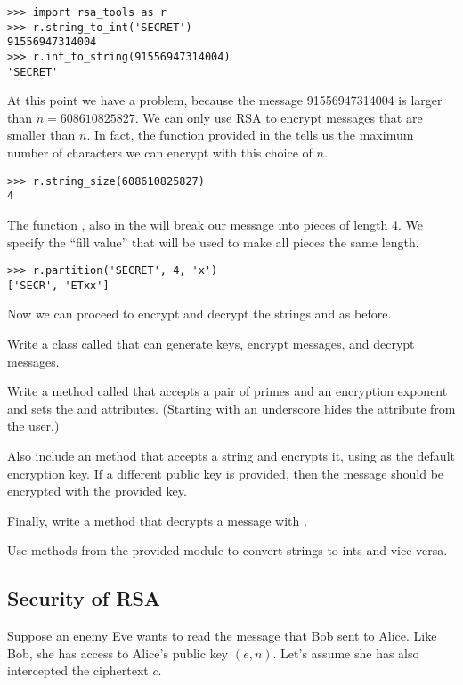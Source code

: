 \begin{lstlisting}
>>> import rsa_tools as r
>>> r.string_to_int('SECRET')
91556947314004
>>> r.int_to_string(91556947314004)
'SECRET'
\end{lstlisting}

At this point we have a problem, because the message 91556947314004 is larger than $n=608610825827$.
We can only use RSA to encrypt messages that are smaller than $n$.
In fact, the function  provided in the  tells us the maximum number of characters we can encrypt with this choice of $n$.

\begin{lstlisting}
>>> r.string_size(608610825827)
4
\end{lstlisting}

The function , also in the  will break our message into pieces of length 4.
We specify the ``fill value''  that will be used to make all pieces the same length.

\begin{lstlisting}
>>> r.partition('SECRET', 4, 'x')
['SECR', 'ETxx']
\end{lstlisting}
Now we can proceed to encrypt and decrypt the strings  and  as before.

\begin{problem}
Write a class called  that can generate keys, encrypt messages, and decrypt messages.

Write a method called  that accepts a pair of primes and an encryption exponent and sets the  and  attributes.
(Starting  with an underscore hides the attribute from the user.)

Also include an  method that accepts a string and encrypts it, using  as the default encryption key.
If a different public key is provided, then the message should be encrypted with the provided key.

Finally, write a  method that decrypts a message with .

Use methods from the provided  module to convert strings to ints and vice-versa.
\label{prob:rsa1}
\end{problem}

\subsection*{Security of RSA}
Suppose an enemy Eve wants to read the message that Bob sent to Alice.
Like Bob, she has access to Alice's public key $(e, n)$.
Let's assume she has also intercepted the ciphertext $c$.


